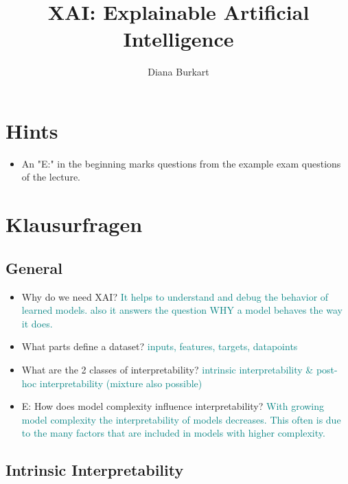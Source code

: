 \documentclass{report}
\title{XAI: Explainable Artificial Intelligence}
\author{Diana Burkart}
\newcommand{\asw}[2][teal]{}
\renewcommand{\asw}[2][teal]{\textcolor{#1}{#2}}
\begin{document}
	
	\maketitle
	\newpage
	
	\tableofcontents
	\newpage
	
	\chapter{Hints}
	
	\begin{itemize}
		\item An "E:" in the beginning marks questions from the example exam questions of the lecture.
	\end{itemize}
	
	\chapter{Klausurfragen}
	
	\section{General}
	
	\begin{itemize}
		\item Why do we need XAI?
		\asw{\newline It helps to understand and debug the behavior of learned models. also it answers the question WHY a model behaves the way it does.}
		\item What parts define a dataset?
		\asw{\newline inputs, features, targets, datapoints}
		\item What are the 2 classes of interpretability?
		\asw{\newline intrinsic interpretability \& post-hoc interpretability (mixture also possible)}
		\item E: How does model complexity influence interpretability?
		\asw{\newline With growing model complexity the interpretability of models decreases. This often is due to the many factors that are included in models with higher complexity.}
	\end{itemize}
	\newpage

	\section{Intrinsic Interpretability}
	
\end{document}
